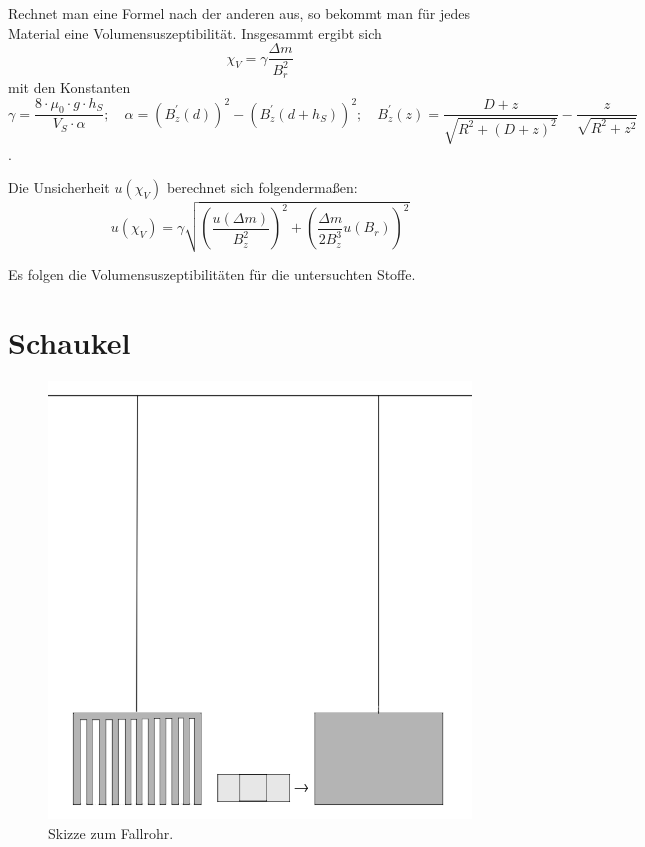\documentclass[11pt,a4paper,titlepage, ngerman]{article}
\begin{document}
	Rechnet man eine Formel nach der anderen aus, so bekommt man für jedes Material eine Volumensuszeptibilität.
	Insgesammt ergibt sich
	\begin{equation}
		\chi_V = \gamma \frac{\Delta m}{B_r^2}
	\end{equation}
	mit den Konstanten
	\begin{equation*}
		\gamma = \frac{8 \cdot \mu_0\cdot g \cdot h_S}{V_S \cdot \alpha};\quad
		\alpha = \left( B_z^{'}(d)\right)^2-\left( B_z^{'}(d+h_S)\right) ^2;\quad
		B_z^{'}(z) = \frac{D+z}{\sqrt{R^2 + (D+z)^2}} - \frac{z}{\sqrt{R^2+z^2}}
	\end{equation*}.
	
	Die Unsicherheit $u(\chi_V)$ berechnet sich folgendermaßen:
	\begin{equation}
		u(\chi_V) = \gamma\sqrt{\left( \frac{u(\Delta m)}{B_z^2}\right) ^2+\left( \frac{\Delta m}{2B_z^3}u(B_r)\right) ^2}
	\end{equation}
	
	Es folgen die Volumensuszeptibilitäten für die untersuchten Stoffe.
	
	\section{Schaukel}
	\begin{figure}[ht]
		\includegraphics[width=\textwidth]{Alu-Platte.png}
		\caption{Skizze zum Fallrohr.}
		\label{fig:schaukel}
	\end{figure}
	
\end{document}
